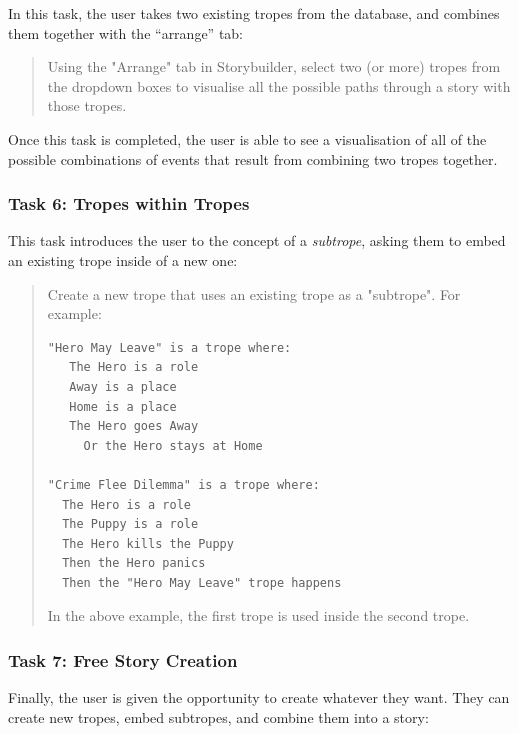 \documentclass[11pt]{report}
\begin{document}
In this task, the user takes two existing tropes from the database, and combines
them together with the ``arrange'' tab:

\begin{framed}
\begin{quote}
Using the "Arrange" tab in Storybuilder, select two (or more) tropes from the dropdown boxes to visualise all the possible paths through a story with those tropes.
\end{quote}
\end{framed}

Once this task is completed, the user is able to see a visualisation of all of the possible
combinations of events that result from combining two tropes together.

\subsubsection*{Task 6: Tropes within Tropes}
\label{sec:orga5bc382}

This task introduces the user to the concept of a \emph{subtrope}, asking them
to embed an existing trope inside of a new one:

\begin{framed}
\begin{quote}
Create a new trope that uses an existing trope as a "subtrope". For example:

\begin{verbatim}
"Hero May Leave" is a trope where:
   The Hero is a role
   Away is a place
   Home is a place
   The Hero goes Away
     Or the Hero stays at Home

"Crime Flee Dilemma" is a trope where:
  The Hero is a role
  The Puppy is a role
  The Hero kills the Puppy
  Then the Hero panics
  Then the "Hero May Leave" trope happens
\end{verbatim}

In the above example, the first trope is used inside the second trope.
\end{quote}
\end{framed}

\subsubsection*{Task 7: Free Story Creation}
\label{sec:orgeed4725}

Finally, the user is given the opportunity to create whatever they want. They
can create new tropes, embed subtropes, and combine them into a story:
\end{document}
